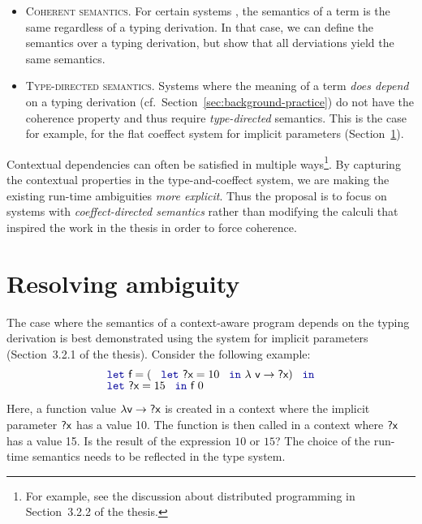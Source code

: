 \documentclass[
		twoside,openright,titlepage,numbers=noenddot,headinclude,%
                footinclude=true,cleardoublepage=empty,
                BCOR=10mm,paper=a4,fontsize=10pt, %
                ngerman,american, %
                ]{scrreprt}
\newcommand{\kvd}[1]{\textnormal{\textcolor{kvdclr}{\ttfamily #1}}}
\newcommand{\ident}[1]{\textnormal{\sffamily #1}}
\begin{document}
\begin{itemize}
\item \textsc{Coherent semantics.} For certain systems \cite{semantics-bltres}, the semantics of
  a term is the same regardless of a typing derivation. In that case, we can define the semantics
  over a typing derivation, but show that all derviations yield the same semantics.

\item \textsc{Type-directed semantics.} Systems where the meaning of a term \emph{does depend}
  on a typing derivation (cf.~Section~\ref{sec:background-practice}) do not have the coherence
  property and thus require \emph{type-directed} semantics. This is the case for example,
  for the flat coeffect system for implicit parameters (Section~\ref{sec:ambiguity}).
\end{itemize}

\noindent
Contextual dependencies can often be satisfied in multiple ways\footnote{For example, see the
discussion about distributed programming in Section~3.2.2 of the thesis.}. By capturing the
contextual properties in the type-and-coeffect system, we are making the existing
run-time ambiguities \emph{more explicit}. Thus the proposal is to focus on systems with
\emph{coeffect-directed semantics} rather than modifying the calculi that inspired the work
in the thesis in order to force coherence.

\section{Resolving ambiguity}
\label{sec:ambiguity}
\vspace{-1em}

The case where the semantics of a context-aware program depends on the typing derivation is best
demonstrated using the system for implicit parameters (Section~3.2.1 of the thesis). Consider the
following example:
%
\begin{equation*}
\begin{array}{l}
\kvd{let}~\ident{f} = (~\kvd{let}~\ident{?x} = 10~\kvd{in}~
  \lambda \ident{v} \rightarrow \ident{?x})~\kvd{in}\\[-0.2em]
\kvd{let}~\ident{?x} = 15~\kvd{in}~\ident{f}~0
\end{array}
\end{equation*}
%
Here, a function value $\lambda \ident{v} \rightarrow \ident{?x}$ is created in a context where the
implicit parameter $\ident{?x}$ has a value 10. The function is then called in a context where
$\ident{?x}$ has a value 15. Is the result of the expression $10$ or $15$? The choice of the
run-time semantics needs to be reflected in the type system.
\end{document}
